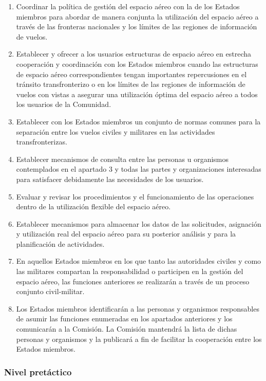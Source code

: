 \begin{enumerate}
    \item Coordinar la política de gestión del espacio aéreo con la de los Estados miembros para abordar de manera conjunta la utilización del espacio aéreo a través de las fronteras nacionales y los límites de las regiones de información de vuelos.
    \item Establecer y ofrecer a los usuarios estructuras de espacio aéreo en estrecha cooperación y coordinación con los Estados miembros cuando las estructuras de espacio aéreo correspondientes tengan importantes repercusiones en el tránsito transfronterizo o en los límites de las regiones de información de vuelos con vistas a asegurar una utilización óptima del espacio aéreo a todos los usuarios de la Comunidad.
    \item Establecer con los Estados miembros un conjunto de normas comunes para la separación entre los vuelos civiles y militares en las actividades transfronterizas.
    \item Establecer mecanismos de consulta entre las personas u organismos contemplados en el apartado 3 y todas las partes y organizaciones interesadas para satisfacer debidamente las necesidades de los usuarios.
    \item Evaluar y revisar los procedimientos y el funcionamiento de las operaciones dentro de la utilización flexible del espacio aéreo.
    \item Establecer mecanismos para almacenar los datos de las solicitudes, asignación y utilización real del espacio aéreo para su posterior análisis y para la planificación de actividades.
    \item En aquellos Estados miembros en los que tanto las autoridades civiles y como las militares compartan la responsabilidad o participen en la gestión del espacio aéreo, las funciones anteriores se realizarán a través de un proceso conjunto civil-militar.
    \item Los Estados miembros identificarán a las personas y organismos responsables de asumir las funciones enumeradas en los apartados anteriores y los comunicarán a la Comisión. La Comisión mantendrá la lista de dichas personas y organismos y la publicará a fin de facilitar la cooperación entre los Estados miembros.
\end{enumerate}

\subsubsection{Nivel pretáctico}

